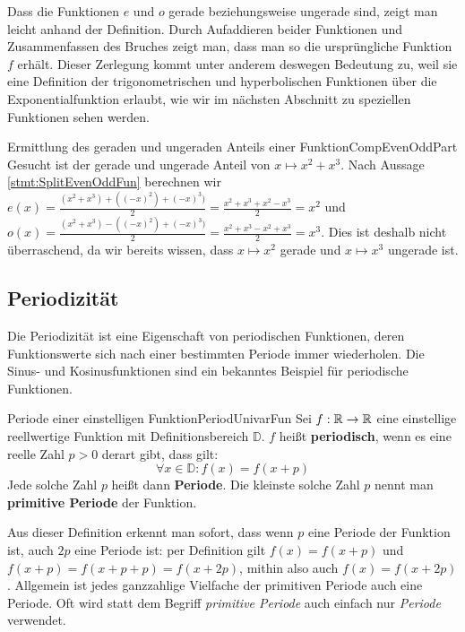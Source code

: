 Dass die Funktionen $e$ und $o$ gerade beziehungsweise ungerade sind, zeigt man leicht anhand der Definition. Durch Aufaddieren beider Funktionen und Zusammenfassen des Bruches zeigt man, dass man so die ursprüngliche Funktion $f$ erhält. Dieser Zerlegung kommt unter anderem deswegen Bedeutung zu, weil sie eine Definition der trigonometrischen und hyperbolischen Funktionen über die Exponentialfunktion erlaubt, wie wir im nächsten Abschnitt zu speziellen Funktionen sehen werden.

\begin{example}{Ermittlung des geraden und ungeraden Anteils einer Funktion}{CompEvenOddPart}
    Gesucht ist der gerade und ungerade Anteil von $x \mapsto x^2+x^3$. Nach Aussage \ref{stmt:SplitEvenOddFun} berechnen wir $e(x) = \frac{(x^2+x^3)+((-x)^2)+(-x)^3)}{2} = \frac{x^2+x^3+x^2-x^3}{2} = x^2$ und $o(x) = \frac{(x^2+x^3)-((-x)^2)+(-x)^3)}{2} = \frac{x^2+x^3-x^2+x^3}{2} = x^3$. Dies ist deshalb nicht überraschend, da wir bereits wissen, dass $x\mapsto x^2$ gerade und $x \mapsto x^3$ ungerade ist.
\end{example}

\subsection{Periodizität}

Die Periodizität ist eine Eigenschaft von periodischen Funktionen, deren Funktionswerte sich nach einer bestimmten Periode immer wiederholen. Die Sinus- und Kosinusfunktionen sind ein bekanntes Beispiel für periodische Funktionen.

\begin{definition}{Periode einer einstelligen Funktion}{PeriodUnivarFun}
    Sei $f: \mathbb{R} \to \mathbb{R}$ eine einstellige reellwertige Funktion mit Definitionsbereich $\mathbb{D}$. $f$ heißt \textbf{periodisch}, wenn es eine reelle Zahl $p>0$ derart gibt, dass gilt:
    $$
        \forall x \in \mathbb{D}: f(x) = f(x+p)
    $$
    Jede solche Zahl $p$ heißt dann \textbf{Periode}. Die kleinste solche Zahl $p$ nennt man \textbf{primitive Periode} der Funktion.
\end{definition}

Aus dieser Definition erkennt man sofort, dass wenn $p$ eine Periode der Funktion ist, auch $2p$ eine Periode ist: per Definition gilt $f(x) = f(x+p)$ und $f(x+p)=f(x+p+p)=f(x+2p)$, mithin also auch $f(x) = f(x+2p)$. Allgemein ist jedes ganzzahlige Vielfache der primitiven Periode auch eine Periode. Oft wird statt dem Begriff \emph{primitive Periode} auch einfach nur \emph{Periode} verwendet.

